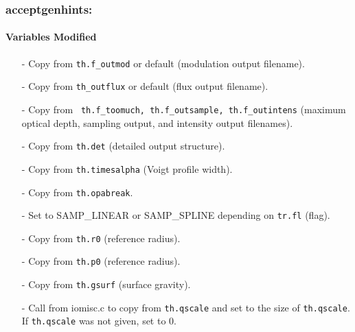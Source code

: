 \documentclass[letterpaper,12pt]{article}
\begin{document}
\subsubsection{acceptgenhints:}
\paragraph{Variables Modified}
\begin{enumerate}[leftmargin=10pt, noitemsep, parsep=0pt, topsep=0ex]
\item[-] Copy  from {\tt th.f\_outmod} or default (modulation
  output filename).
\item[-] Copy  from {\tt th\_outflux} or default (flux output filename).
\item[-] Copy  from {\tt
    th.f\_toomuch, th.f\_outsample, th.f\_outintens} (maximum optical depth,
  sampling output, and intensity output filenames).
\item[-] Copy  from {\tt th.det} (detailed output structure).
\item[-] Copy  from {\tt th.timesalpha} (Voigt profile width).
\item[-] Copy  from {\tt th.opabreak}.
\item[-] Set  to SAMP\_LINEAR or SAMP\_SPLINE depending on {\tt tr.fl} (flag).
\item[-] Copy  from {\tt th.r0} (reference radius).
\item[-] Copy  from {\tt th.p0} (reference radius).
\item[-] Copy  from {\tt th.gsurf} (surface gravity).
\item[-] Call  from iomisc.c to copy   from {\tt th.qscale} and set  to the size of {\tt th.qscale}. If {\tt th.qscale} was not given, set  to 0.
\end{enumerate}
\end{document}
